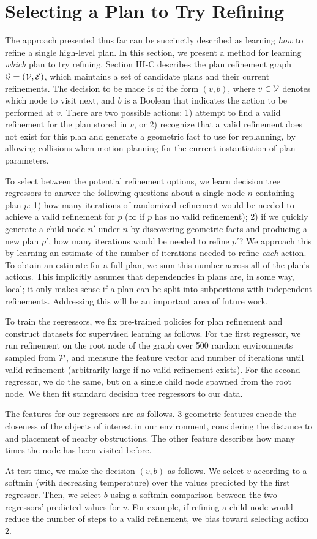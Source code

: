 \section{Selecting a Plan to Try Refining}
The approach presented thus far can be succinctly described as learning \emph{how} to
refine a single high-level plan. In this section, we present a method for learning
\emph{which} plan to try refining. Section III-C describes the plan refinement graph $\mathcal{G} = (\mathcal{V}, \mathcal{E})$,
which maintains a set of candidate plans and their current refinements. The decision to be made is of the form $(v, b)$,
where $v \in \mathcal{V}$ denotes which node to visit next, and $b$ is a Boolean that indicates the action
to be performed at $v$. There are two possible actions: 1) attempt to find a valid refinement
for the plan stored in $v$, or 2) recognize that a valid refinement does not exist for this plan
and generate a geometric fact to use for replanning, by allowing collisions when motion planning
for the current instantiation of plan parameters.

To select between the potential refinement options, we learn decision tree regressors
to answer the following questions about a single node $n$ containing plan $p$: 1) how many iterations of randomized refinement
would be needed to achieve a valid refinement for $p$ ($\infty$ if $p$ has no valid refinement); 2)
if we quickly generate a child node $n'$ under $n$ by discovering geometric facts and producing a new plan $p'$,
how many iterations would be needed to refine $p'$? We approach this by learning an estimate of the
number of iterations needed to refine \emph{each} action. To obtain an estimate for a full plan, we
sum this number across all of the plan's actions. This implicitly assumes that dependencies in plans are, in some way, local;
it only makes sense if a plan can be split into subportions with independent refinements.
Addressing this will be an important area of future work.

To train the regressors, we fix pre-trained policies for plan refinement and construct datasets
for supervised learning as follows. For the first regressor, we run refinement on the root
node of the graph over 500 random environments sampled from $\mathcal{P}$, and measure the feature vector and number of iterations
until valid refinement (arbitrarily large if no valid refinement exists).
For the second regressor, we do the same, but on a single child node spawned from the root node.
We then fit standard decision tree regressors to our data.

The features for our regressors are as follows. 3 geometric features encode the closeness of the objects
of interest in our environment, considering the distance to and placement of nearby obstructions. The other
feature describes how many times the node has been visited before.

At test time, we make the decision $(v, b)$ as follows. We select $v$ according to a softmin (with decreasing temperature) over the values
predicted by the first regressor. Then, we select $b$ using a softmin comparison between the two regressors'
predicted values for $v$. For example, if refining a child node would reduce the number of steps to a valid refinement,
we bias toward selecting action 2.
